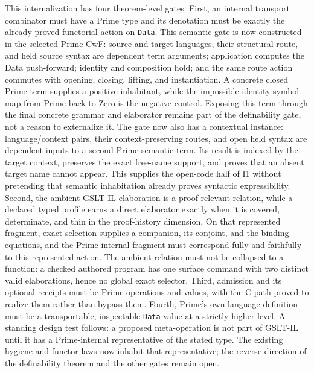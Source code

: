 \documentclass[11pt]{article}
\newcommand{\code}[1]{\texttt{#1}}
\begin{document}
This internalization has four theorem-level gates.  First, an internal transport
combinator must have a Prime type and its denotation must be exactly the already
proved functorial action on \code{Data}.  This semantic gate is now constructed
in the selected Prime CwF: source and target languages, their structural route,
and held source syntax are dependent term arguments; application computes the
Data push-forward; identity and composition hold; and the same route action
commutes with opening, closing, lifting, and instantiation.  A concrete closed
Prime term supplies a positive inhabitant, while the impossible identity-symbol
map from Prime back to Zero is the negative control.  Exposing this term through
the final concrete grammar and elaborator remains part of the definability gate,
not a reason to externalize it.  The gate now also has a contextual instance:
language/context pairs, their context-preserving routes, and open held syntax are
dependent inputs to a second Prime semantic term.  Its result is indexed by the
target context, preserves the exact free-name support, and proves that an absent
target name cannot appear.  This supplies the open-code half of I1 without
pretending that semantic inhabitation already proves syntactic expressibility.
Second, the ambient GSLT-IL elaboration is a proof-relevant relation, while a
declared typed profile earns a direct elaborator exactly when it is covered,
determinate, and thin in the proof-history dimension.  On that represented
fragment, exact selection supplies a companion, its conjoint, and the binding
equations, and the Prime-internal fragment must correspond fully and faithfully
to this represented action.  The ambient relation must not be collapsed to a
function: a checked authored program has one surface command with two distinct
valid elaborations, hence no global exact selector.  Third, admission and its optional
receipts must be Prime operations and values, with the C path proved to realize
them rather than bypass them.  Fourth, Prime's own language definition must be a
transportable, inspectable \code{Data} value at a strictly higher level.  A
standing design test follows: a proposed meta-operation is not part of GSLT-IL
until it has a Prime-internal representative of the stated type.  The existing
hygiene and functor laws now inhabit that representative; the reverse direction
of the definability theorem and the other gates remain open.
\end{document}
